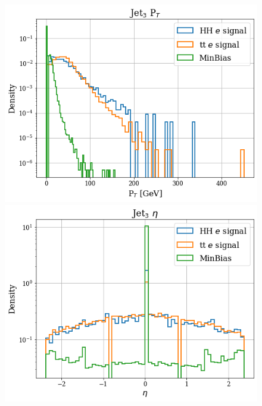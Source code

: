 \documentclass[../main.tex]{subfiles}
\begin{document}
\begin{figure}[!ht]
  \begin{minipage}[b]{0.33\linewidth}
    \centering
    \includegraphics[width=1\linewidth]{Chapters/Plots/Hist_1ele_jet3_Et.png}
  \end{minipage}%
  \begin{minipage}[b]{0.33\linewidth}
    \centering
    \includegraphics[width=1\linewidth]{Chapters/Plots/Hist_1ele_jet3_Eta.png}
  \end{minipage} %
  \begin{minipage}[b]{0.33\linewidth}

\end{minipage}
\end{figure}
\end{document}
